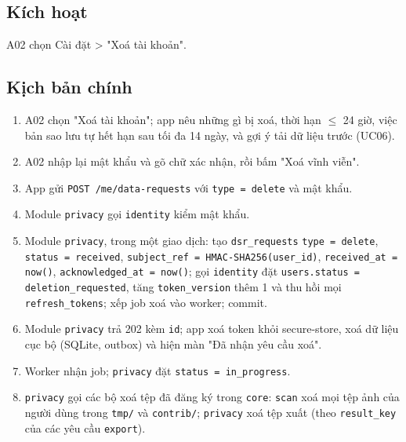 \subsection{Kích hoạt}
A02 chọn Cài đặt > "Xoá tài khoản".

\subsection{Kịch bản chính}
\begin{enumerate}
\item A02 chọn "Xoá tài khoản"; app nêu những gì bị xoá, thời hạn \ensuremath{\leq} 24 giờ, việc bản sao lưu tự hết hạn sau tối đa 14 ngày, và gợi ý tải dữ liệu trước (UC06).
\item A02 nhập lại mật khẩu và gõ chữ xác nhận, rồi bấm "Xoá vĩnh viễn".
\item App gửi {\small\texttt{POST /\allowbreak{}\allowbreak{}me/\allowbreak{}\allowbreak{}data-\allowbreak{}requests}} với {\small\texttt{type = delete}} và mật khẩu.
\item Module {\small\texttt{privacy}} gọi {\small\texttt{identity}} kiểm mật khẩu.
\item Module {\small\texttt{privacy}}, trong một giao dịch: tạo {\small\texttt{dsr\_\allowbreak{}\allowbreak{}requests}} {\small\texttt{type = delete}}, {\small\texttt{status = received}}, {\small\texttt{subject\_\allowbreak{}\allowbreak{}ref = HMAC-\allowbreak{}SHA256(user\_\allowbreak{}\allowbreak{}id)}}, {\small\texttt{received\_\allowbreak{}\allowbreak{}at = now()}}, {\small\texttt{acknowledged\_\allowbreak{}\allowbreak{}at = now()}}; gọi {\small\texttt{identity}} đặt {\small\texttt{users.\allowbreak{}status = deletion\_\allowbreak{}\allowbreak{}requested}}, tăng {\small\texttt{token\_\allowbreak{}\allowbreak{}version}} thêm 1 và thu hồi mọi {\small\texttt{refresh\_\allowbreak{}\allowbreak{}tokens}}; xếp job xoá vào worker; commit.
\item Module {\small\texttt{privacy}} trả 202 kèm {\small\texttt{id}}; app xoá token khỏi secure-\allowbreak{}store, xoá dữ liệu cục bộ (SQLite, outbox) và hiện màn "Đã nhận yêu cầu xoá".
\item Worker nhận job; {\small\texttt{privacy}} đặt {\small\texttt{status = in\_\allowbreak{}\allowbreak{}progress}}.
\item {\small\texttt{privacy}} gọi các bộ xoá tệp đã đăng ký trong {\small\texttt{core}}: {\small\texttt{scan}} xoá mọi tệp ảnh của người dùng trong {\small\texttt{tmp/\allowbreak{}\allowbreak{}}} và {\small\texttt{contrib/\allowbreak{}\allowbreak{}}}; {\small\texttt{privacy}} xoá tệp xuất (theo {\small\texttt{result\_\allowbreak{}\allowbreak{}key}} của các yêu cầu {\small\texttt{export}}).

\end{enumerate}

